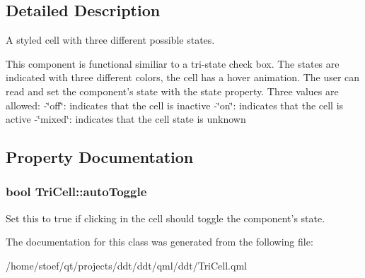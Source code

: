\subsection{Detailed Description}
A styled cell with three different possible states. 

This component is functional similiar to a tri-\/state check box. The states are indicated with three different colors, the cell has a hover animation. The user can read and set the component's state with the {\ttfamily state} property. Three values are allowed\-: -\/{\ttfamily \char`\"{}off\char`\"{}}\-: indicates that the cell is inactive -\/{\ttfamily \char`\"{}on\char`\"{}}\-: indicates that the cell is active -\/{\ttfamily \char`\"{}mixed\char`\"{}}\-: indicates that the cell state is unknown 

\subsection{Property Documentation}
\hypertarget{classTriCell_a0be9a37b36e9ef3979ad775469415e69}{
\subsubsection[{auto\-Toggle}]{\setlength{\rightskip}{0pt plus 5cm}bool Tri\-Cell\-::auto\-Toggle}}\label{classTriCell_a0be9a37b36e9ef3979ad775469415e69}
Set this to {\ttfamily true} if clicking in the cell should toggle the component's state. 

The documentation for this class was generated from the following file\-:\begin{DoxyCompactItemize}
\item 
/home/stoef/qt/projects/ddt/ddt/qml/ddt/Tri\-Cell.\-qml\end{DoxyCompactItemize}
